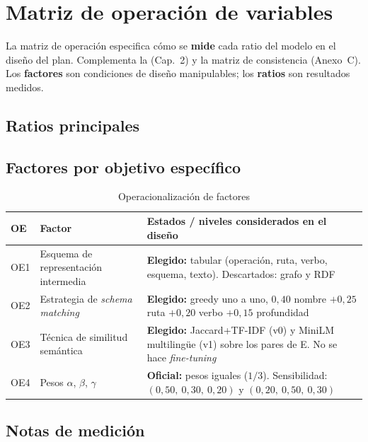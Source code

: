 \chapter{Matriz de operación de variables}
\label{anexo:d}

La matriz de operación especifica cómo se \textbf{mide} cada ratio del modelo en el diseño del plan.
Complementa la  (Cap.~2) y la matriz de consistencia (Anexo~C). Los
\textbf{factores} son condiciones de diseño manipulables; los \textbf{ratios} son resultados medidos.

\section{Ratios principales}

\small

\normalsize

\section{Factores por objetivo específico}

\begin{table}[H]
  \centering
  \caption{Operacionalización de factores}
  \label{tab:anexo-d-vi}
  \small
  \begin{tabular}{@{}p{}p{}p{}@{}}
    \toprule
    \textbf{OE} & \textbf{Factor} & \textbf{Estados / niveles considerados en el diseño} \\
    \midrule
    OE1 &
    Esquema de representación intermedia &
    \textbf{Elegido:} tabular (operación, ruta, verbo, esquema, texto). Descartados: grafo y RDF \\
    OE2 &
    Estrategia de \textit{schema matching} &
    \textbf{Elegido:} greedy uno a uno, $0{,}40$ nombre $+ 0{,}25$ ruta $+ 0{,}20$ verbo $+ 0{,}15$ profundidad \\
    OE3 &
    Técnica de similitud semántica &
    \textbf{Elegido:} Jaccard+TF-IDF (v0) y MiniLM multilingüe (v1) sobre los pares de E. No se hace \textit{fine-tuning} \\
    OE4 &
    Pesos $\alpha$, $\beta$, $\gamma$ &
    \textbf{Oficial:} pesos iguales ($1/3$). Sensibilidad: $(0{,}50,\ 0{,}30,\ 0{,}20)$ y $(0{,}20,\ 0{,}50,\ 0{,}30)$ \\
    \bottomrule
  \end{tabular}
\end{table}

\section{Notas de medición}

